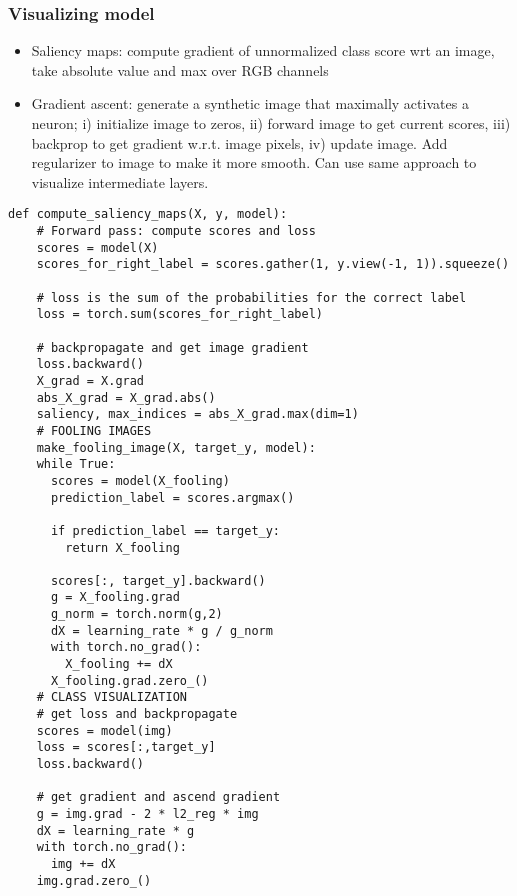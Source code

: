 \documentclass[9pt]{extarticle}
\begin{document}
\subsubsection{Visualizing model}
\begin{itemize}
    \item Saliency maps: compute gradient of unnormalized class score wrt an image, take absolute value and max over RGB channels
    \item Gradient ascent: generate a synthetic image that maximally activates a neuron; i) initialize image to zeros, ii) forward image to get current scores, iii) backprop to get gradient w.r.t. image pixels, iv) update image. Add regularizer to image to make it more smooth. Can use same approach to visualize intermediate layers.
\end{itemize}
\begin{lstlisting}[multicols=2]
    def compute_saliency_maps(X, y, model):
    # Forward pass: compute scores and loss
    scores = model(X)
    scores_for_right_label = scores.gather(1, y.view(-1, 1)).squeeze()
    
    # loss is the sum of the probabilities for the correct label
    loss = torch.sum(scores_for_right_label)

    # backpropagate and get image gradient
    loss.backward()
    X_grad = X.grad
    abs_X_grad = X_grad.abs()
    saliency, max_indices = abs_X_grad.max(dim=1)
    # FOOLING IMAGES
    make_fooling_image(X, target_y, model):
    while True:
      scores = model(X_fooling)
      prediction_label = scores.argmax()

      if prediction_label == target_y:
        return X_fooling
        
      scores[:, target_y].backward()
      g = X_fooling.grad
      g_norm = torch.norm(g,2)
      dX = learning_rate * g / g_norm
      with torch.no_grad():
        X_fooling += dX
      X_fooling.grad.zero_()
    # CLASS VISUALIZATION
    # get loss and backpropagate
    scores = model(img)
    loss = scores[:,target_y]
    loss.backward()
    
    # get gradient and ascend gradient
    g = img.grad - 2 * l2_reg * img
    dX = learning_rate * g
    with torch.no_grad():
      img += dX
    img.grad.zero_()
\end{lstlisting}
\end{document}
